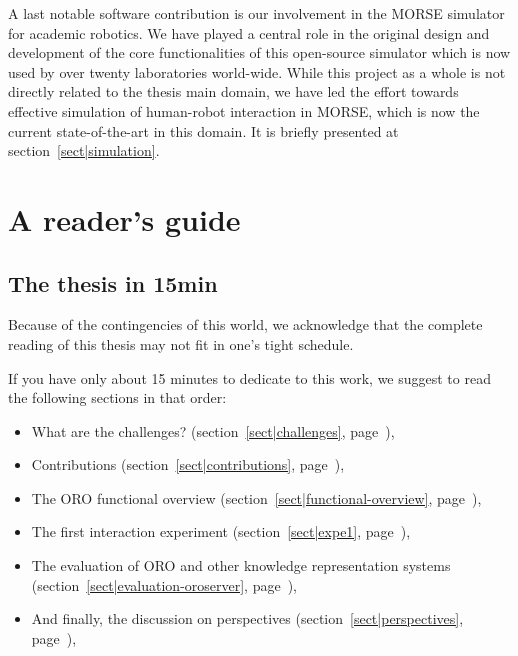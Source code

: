 A last notable software contribution is our involvement in the MORSE simulator
for academic robotics. We have played a central role in the original design and
development of the core functionalities of this open-source simulator which is
now used by over twenty laboratories world-wide. While this project as a whole
is not directly related to the thesis main domain, we have led the effort towards
effective simulation of human-robot interaction in MORSE, which is now the
current state-of-the-art in this domain. It is briefly presented at
section~\ref{sect|simulation}.




\section{A reader's guide}

\subsection*{The thesis in 15min}

Because of the contingencies of this world, we acknowledge that the complete
reading of this thesis may not fit in one's tight schedule.

If you have only about 15 minutes to dedicate to this work, we suggest to read
the following sections in that order:

\begin{itemize} \item What are the challenges? (section~\ref{sect|challenges},
            page~\pageref{sect|challenges}),

    \item Contributions (section~\ref{sect|contributions},
        page~\pageref{sect|contributions}),

    \item The ORO functional overview (section~\ref{sect|functional-overview},
        page~\pageref{sect|functional-overview}),

    \item The first interaction experiment (section~\ref{sect|expe1},
        page~\pageref{sect|expe1}),

    \item The evaluation of ORO and other knowledge representation systems
        (section~\ref{sect|evaluation-oroserver},
        page~\pageref{sect|evaluation-oroserver}),

    \item And finally, the discussion on perspectives
        (section~\ref{sect|perspectives}, page~\pageref{sect|perspectives}),

\end{itemize}

